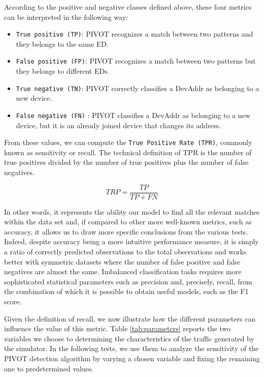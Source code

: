 \vspace{3mm}

According to the positive and negative classes defined above, these four metrics can be interpreted in the following way:

\vspace{3mm}
\begin{itemize}
    \item \texttt{True positive (TP)}: PIVOT recognizes a match between two patterns and they belongs to the same ED.
    \item \texttt{False positive (FP)}: PIVOT recognizes a match between two patterns but they belongs to different EDs.
    \item \texttt{True negative (TN)}: PIVOT correctly classifies a DevAddr as belonging to a new device. 
    \item \texttt{False negative (FN)} : PIVOT classifies a DevAddr as belonging to a new device, but it is an already joined device that changes its address. 
\end{itemize}
\vspace{3mm}

From these values, we can compute the \texttt{True Positive Rate (TPR)}, commonly known as sensitivity or recall. The technical definition of TPR is the number of true positives divided by the number of true positives plus the number of false negatives.

\[ TRP = \frac{TP}{TP + FN} \]

In other words, it represents the ability our model to find all the relevant matches within the data set and, if compared to other more well-known metrics, such as accuracy, it allows us to draw more specific conclusions from the various tests. Indeed, despite accuracy being a more intuitive performance measure, it is simply a ratio of correctly predicted observations to the total observations and works better with symmetric datasets where the number of false positive and false negatives are almost the same. Imbalanced classification tasks requires more sophisticated statistical parameters such as precision and, precisely, recall, from the combination of which it is possible to obtain useful models, such as the F1 score.

\vspace{3mm}

\vspace{3mm}

Given the definition of recall, we now illustrate how the different parameters can influence the value of this metric. Table \ref{tab:parameters} reports the two variables we choose to determining the characteristics of the traffic generated by the simulator. In the following tests, we use them to analyze the sensitivity of the PIVOT detection algorithm by varying a chosen variable and fixing the remaining one to predetermined values.

